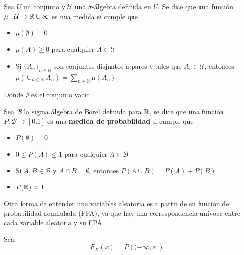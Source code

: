 \begin{definicion}[Medida]
Sea $U$ un conjunto y $\mathcal{U}$ una $\sigma$-álgebra definida en $U$. Se dice que una función
$\mu : \mathcal{U} \rightarrow \mathbb{R} \cup {\infty}$ es una medida si cumple que
\begin{itemize}
\item $\mu(\emptyset) = 0$
\item $\mu(A) \geq 0$ para cualquier $A \in \mathcal{U}$
\item Si $\{ A_n \}_{n\in \mathbb{N}}$ son conjuntos disjuntos a pares y tales que 
$A_i \in \mathcal{U}$, entonces 
$\displaystyle \mu\left( \cup_{n\in \mathbb{N}} A_n \right) = \sum_{n\in \mathbb{N}} \mu(A_n)$
\end{itemize}
Donde $\emptyset$ es el conjunto vacío %
\end{definicion}

\begin{definicion}
Sea $\mathcal{B}$ la sigma álgebra de Borel definida para $\mathbb{R}$, se dice que una función
$P : \mathcal{B} \rightarrow [0.1]$ es una \textbf{medida de probabilidad} si cumple que
\begin{itemize}
\item $P(\emptyset) = 0$
\item $0 \leq P(A) \leq 1$ para cualquier $A \in \mathcal{B}$
\item Si $A, B \in \mathcal{B}$ y $A\cap B = \emptyset$, entonces $P(A \cup B) = P(A) + P(B)$ 
\item $P(\mathbb{R}) = 1$
\end{itemize}
\label{variable_aleatoria}
\end{definicion}


Otra forma de entender una variables aleatoria es a partir de su función de probabilidad
acumulada (FPA), ya que hay una correspondencia unívoca entre cada variable aleatoria y su FPA.

\begin{definicion}
Sea 
\begin{equation*}
F_X (x) = P\left( (-\infty,x] \right)
\end{equation*}
\end{definicion}

